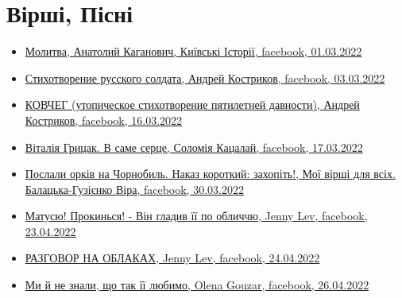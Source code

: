  
 
 
 
 


\section{Вірші, Пісні}
\label{sec:topics.vojna.poezia}

\begin{itemize} %

\item \hyperlink{01_03_2022.fb.fb_group.story_kiev_ua.1.molitva}{%
Молитва, Анатолий Каганович, Київські Історії, facebook, 01.03.2022%
}

\item \hyperlink{03_03_2022.fb.kostrikov_andrej.odessa.1.stih_russkogo_soldata}{%
Стихотворение русского солдата, Андрей Костриков, facebook, 03.03.2022%
}

\item \hyperlink{16_03_2022.fb.kostrikov_andrej.odessa.1.kovcheg}{%
КОВЧЕГ (утопическое стихотворение пятилетней давности), Андрей Костриков, facebook, 16.03.2022%
}

\item \hyperlink{17_03_2022.fb.katsalaj_solomia.1.vitalia_grycak_v_same_serce}{%
Віталія Грицак. В саме серце, Соломія Кацалай, facebook, 17.03.2022%
}

\item \hyperlink{30_03_2022.fb.balatska_vira.gostomel.1.orki_chernobyl}{%
Послали орків на Чорнобиль. Наказ короткий: захопіть!, Мої вірші для всіх. Балацька-Гузієнко Віра, %
facebook, 30.03.2022%
}

\item \hyperlink{23_04_2022.fb.jenny_lev.1.matusju_prokynsja}{%
Матусю! Прокинься! - Він гладив її по обличчю, Jenny Lev, facebook, 23.04.2022%
}

\item \hyperlink{24_04_2022.fb.jenny_lev.1.razgovor_na_oblakah}{%
РАЗГОВОР НА ОБЛАКАХ, Jenny Lev, facebook, 24.04.2022%
}

\item \hyperlink{26_04_2022.fb.gouzar_olena.1.ne_znaly_scho_tak_ii_ljubymo}{%
Ми й не знали, що так її любимо, Olena Gouzar, facebook, 26.04.2022%
}


\end{itemize} %
